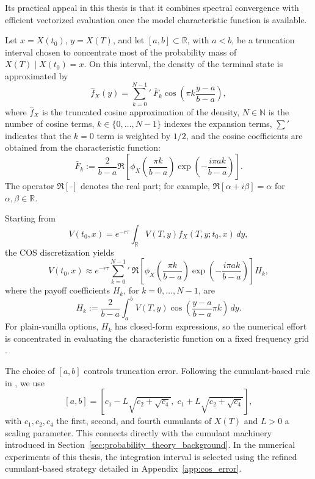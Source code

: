 Its practical appeal in this thesis is that it combines spectral convergence with efficient vectorized evaluation once the model characteristic function is available.

Let $x=X(t_0)$, $y=X(T)$, and let $[a,b]\subset\mathbb R$, with $a<b$, be a truncation interval chosen to concentrate most of the probability mass of $X(T)\mid X(t_0)=x$. On this interval, the density of the terminal state is approximated by
\begin{equation}
    \label{eq:cos_density_expansion}
    \hat f_X(y)=\sum_{k=0}^{N-1}\!'\ \bar F_k\cos\left(\pi k\frac{y-a}{b-a}\right),
\end{equation}
where $\hat f_X$ is the truncated cosine approximation of the density, $N\in\mathbb N$ is the number of cosine terms, $k\in\{0,\ldots,N-1\}$ indexes the expansion terms, $\sum'$ indicates that the $k=0$ term is weighted by $1/2$, and the cosine coefficients are obtained from the characteristic function:
\begin{equation}
    \label{eq:cos_density_coefficients}
    \bar F_k:=\frac{2}{b-a}\Re\!\left[\phi_X\!\left(\frac{\pi k}{b-a}\right)\exp\!\left(-\frac{i\pi ak}{b-a}\right)\right].
\end{equation}
The operator $\Re[\cdot]$ denotes the real part; for example, $\Re[\alpha+i\beta]=\alpha$ for $\alpha,\beta\in\mathbb R$.

Starting from
\begin{equation}
    \label{eq:cos_pricing_integral}
    V(t_0,x)=e^{-r\tau}\int_{\mathbb R}V(T,y)f_X(T,y;t_0,x)\,dy,
\end{equation}
the COS discretization yields
\begin{equation}
    \label{eq:cos_price_approximation}
    V(t_0,x)\approx e^{-r\tau}\sum_{k=0}^{N-1}\!'\ \Re\!\left[\phi_X\!\left(\frac{\pi k}{b-a}\right)\exp\!\left(-\frac{i\pi ak}{b-a}\right)\right]H_k,
\end{equation}
where the payoff coefficients $H_k$, for $k=0,\ldots,N-1$, are
\begin{equation}
    \label{eq:cos_payoff_coefficients}
    H_k:=\frac{2}{b-a}\int_a^b V(T,y)\cos\left(\frac{y-a}{b-a}\pi k\right)\,dy.
\end{equation}
For plain-vanilla options, $H_k$ has closed-form expressions, so the numerical effort is concentrated in evaluating the characteristic function on a fixed frequency grid \cite[Sec.~3]{fang_oosterlee_2009}.

The choice of $[a,b]$ controls truncation error. Following the cumulant-based rule in \cite[Sec.~5]{fang_oosterlee_2009}, we use
\begin{equation}
    \label{eq:cos_cumulant_interval}
    [a,b]=\left[c_1-L\sqrt{c_2+\sqrt{c_4}},\;c_1+L\sqrt{c_2+\sqrt{c_4}}\right],
\end{equation}
with $c_1,c_2,c_4$ the first, second, and fourth cumulants of $X(T)$ and $L>0$ a scaling parameter. This connects directly with the cumulant machinery introduced in Section~\ref{sec:probability_theory_background}.
In the numerical experiments of this thesis, the integration interval is selected using the refined cumulant-based strategy detailed in Appendix~\ref{app:cos_error}.

